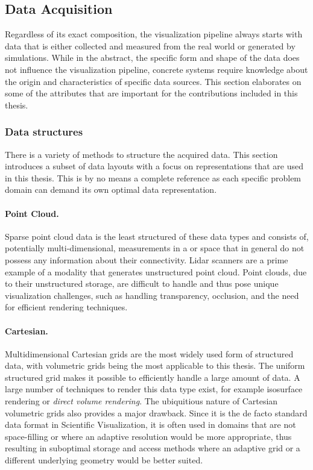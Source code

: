 \subsection{Data Acquisition} \label{cha:intro:vp:da}
Regardless of its exact composition, the visualization pipeline always starts with data that is either collected and measured from the real world or generated by simulations.  While in the abstract, the specific form and shape of the data does not influence the visualization pipeline, concrete systems require knowledge about the origin and characteristics of specific data sources.  This section elaborates on some of the attributes that are important for the contributions included in this thesis.

\subsubsection{Data structures} \label{cha:intro:vp:da:datastructures}
There is a variety of methods to structure the acquired data.  This section introduces a subset of data layouts with a focus on representations that are used in this thesis.  This is by no means a complete reference as each specific problem domain can demand its own optimal data representation.

\paragraph{Point Cloud. }  Sparse point cloud data is the least structured of these data types and consists of, potentially multi-dimensional, measurements in a  or  space that in general do not possess any information about their connectivity.  Lidar scanners are a prime example of a modality that generates unstructured point cloud.  Point clouds, due to their unstructured storage, are difficult to handle and thus pose unique visualization challenges, such as handling transparency, occlusion, and the need for efficient rendering techniques.

\paragraph{Cartesian. }  Multidimensional Cartesian grids are the most widely used form of structured data, with  volumetric grids being the most applicable to this thesis.  The uniform structured grid makes it possible to efficiently handle a large amount of data.  A large number of techniques to render this data type exist, for example isosurface rendering or \emph{direct volume rendering}.  The ubiquitious nature of Cartesian volumetric grids also provides a major drawback.  Since it is the de facto standard data format in Scientific Visualization, it is often used in domains that are not space-filling or where an adaptive resolution would be more appropriate, thus resulting in suboptimal storage and access methods where an adaptive grid or a different underlying geometry would be better suited.


